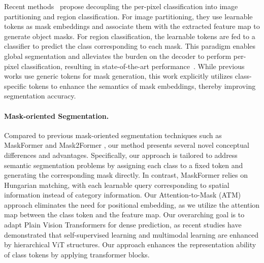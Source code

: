 Recent methods~\cite{maskformer, strudel2021segmenter, knet} propose decoupling the per-pixel classification into image partitioning and region classification. For image partitioning, they use learnable tokens as mask embeddings and associate them with the extracted feature map to generate object masks. For region classification, the learnable tokens are fed to a classifier to predict the class corresponding to each mask. This paradigm enables global segmentation and alleviates the burden on the decoder to perform per-pixel classification, resulting in state-of-the-art performance~\cite{maskformer}.  While previous works use generic tokens for mask generation, this work explicitly utilizes class-specific tokens to enhance the semantics of mask embeddings, thereby improving segmentation accuracy. 

\paragraph{Mask-oriented Segmentation.}
Compared to previous mask-oriented segmentation techniques such as MaskFormer \cite{cheng2021maskformer} and Mask2Former \cite{cheng2021mask2former}, our method presents several novel conceptual differences and advantages. Specifically, our approach is tailored to address semantic segmentation problems by assigning each class to a fixed token and generating the corresponding mask directly. In contrast, MaskFormer relies on Hungarian matching, with each learnable query corresponding to spatial information instead of category information. Our Attention-to-Mask (ATM) approach eliminates the need for positional embedding, as we utilize the attention map between the class token and the feature map. Our overarching goal is to adapt Plain Vision Transformers for dense prediction, as recent studies have demonstrated that self-supervised learning \cite{he2022masked,chen2022context,touvron2022deit,beitv2} and multimodal learning \cite{radford2021learning} are enhanced by hierarchical ViT structures. Our approach enhances the representation ability of class tokens by applying transformer blocks.

